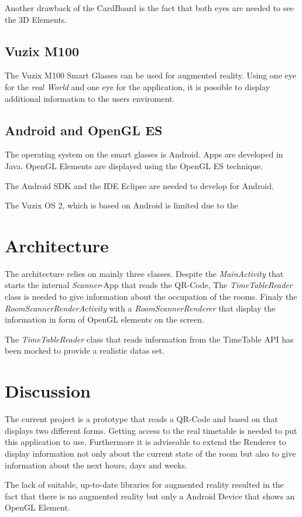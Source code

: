\documentclass[11pt]{scrartcl}
\begin{document}
\begin{multicols}{2}
			Another drawback of the CardBoard is the fact that both eyes are needed to see the 3D Elements.   
		
		\subsection{Vuzix M100}
			The Vuzix M100 Smart Glasses can be used for augmented reality. Using one eye for the \emph{real World} and one eye for the application, it is possible to display additional information to the users enviroment.
		
		\subsection{Android and OpenGL ES}
			The operating system on the smart glasses is Android. Apps are developed in Java. OpenGL Elements are displayed using the OpenGL ES technique.
	
			The Android SDK and the IDE Eclipse are needed to develop for Android.
			
			The Vuzix OS 2, which is based on Android is limited due to the 
	\section{Architecture}
		The architecture relies on mainly three classes. Despite the \emph{MainActivity} that starts the internal \emph{Scanner}-App that reads the QR-Code, The \emph{TimeTableReader} class is needed to give information about the occupation of the rooms. Finaly the \emph{RoomScannerRenderActivity} with a \emph{RoomScannerRenderer} that display the information in form of OpenGL elements on the screen.
		
		The \emph{TimeTableReader} class that reads information from the TimeTable API has been mocked to provide a realistic datas set. 
	
	\section{Discussion}
		The current project is a prototype that reads a QR-Code and based on that displays two different forms. Getting access to the real timetable is needed to put this application to use. Furthermore it is adviseable to extend the Renderer to display information not only about the current state of the room but also to give information about the next hours, days and weeks.
		
		The lack of suitable, up-to-date libraries for augmented reality resulted in the fact that there is no augmented reality but only a Android Device that shows an \linebreak OpenGL Element.  


\end{multicols}
\end{document}
